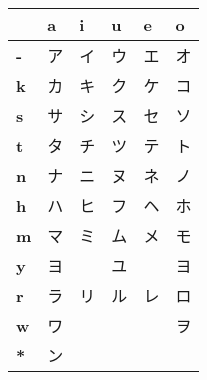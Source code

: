 


\bigskip
\begin{center}	
\Huge


\begin{tabular}{m{1.0cm}||m{1.0cm}|m{1.0cm}|m{1.0cm}|m{1.0cm}|m{1.0cm}|}
& \textbf{a}& \textbf{i}& \textbf{u}& \textbf{e}& \textbf{o}\\ \hline \hline 
\textbf{-}&\smallskip ア&\smallskip イ&\smallskip ウ&\smallskip エ&\smallskip オ\\ \hline 
\textbf{k}&\smallskip カ&\smallskip キ&\smallskip ク&\smallskip ケ&\smallskip コ\\ \hline 
\textbf{s}&\smallskip サ&\smallskip シ&\smallskip ス&\smallskip セ&\smallskip ソ\\ \hline 
\textbf{t}&\smallskip タ&\smallskip チ&\smallskip ツ&\smallskip テ&\smallskip ト\\ \hline 
\textbf{n}&\smallskip ナ&\smallskip ニ&\smallskip ヌ&\smallskip ネ&\smallskip ノ\\ \hline 
\textbf{h}&\smallskip ハ&\smallskip ヒ&\smallskip フ&\smallskip ヘ&\smallskip ホ\\ \hline 
\textbf{m}&\smallskip マ&\smallskip ミ&\smallskip ム&\smallskip メ&\smallskip モ\\ \hline 
\textbf{y}&\smallskip ヨ&\smallskip   &\smallskip ユ&\smallskip   &\smallskip ヨ\\ \hline 
\textbf{r}&\smallskip ラ&\smallskip リ&\smallskip ル&\smallskip レ&\smallskip ロ\\ \hline 
\textbf{w}&\smallskip ワ&\smallskip   &\smallskip   &\smallskip   &\smallskip ヲ\\ \hline 
\textbf{*}&\smallskip ン&\smallskip   &\smallskip   &\smallskip   &\smallskip   \\ \hline 
\end{tabular}
\end{center}
